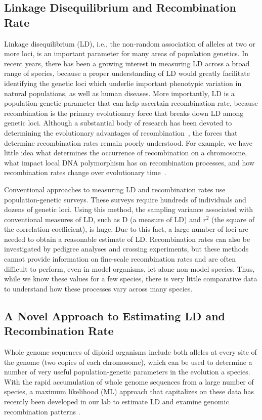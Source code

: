 \documentclass{sig-alternate}
\begin{document}
\subsection{Linkage Disequilibrium and Recombination Rate}\label{sec:LD}
Linkage disequilibrium (LD), i.e., the non-random association of alleles at two or more loci, is an important parameter for many areas of population genetics.  In recent years, there has been a growing interest in measuring LD across a broad range of species, because a proper understanding of LD would greatly facilitate identifying the genetic loci which underlie important phenotypic variation in natural populations, as well as human diseases. More importantly, LD is a population-genetic parameter that can help ascertain recombination rate, because recombination is the primary evolutionary force that breaks down LD among genetic loci. Although a substantial body of research has been devoted to determining the evolutionary advantages of recombination~\cite{resolving-paradox}, the forces that determine recombination rates remain poorly understood. For example, we have little idea what determines the occurrence of recombination on a chromosome, what impact local DNA polymorphism has on recombination processes, and how recombination rates change over evolutionary time~\cite{stumpf}. 

Conventional approaches to measuring LD and recombination rates use population-genetic surveys. These surveys require hundreds of individuals and dozens of genetic loci. Using this method, the sampling variance associated with conventional measures of LD, such as D (a measure of LD) and $r^2$ (the square of the correlation coefficient), is huge. Due to this fact, a large number of loci are needed to obtain a reasonable estimate of LD.  Recombination rates can also be investigated by pedigree analyses and crossing experiments, but these methods cannot provide information on fine-scale recombination rates and are often difficult to perform, even in model organisms, let alone non-model species. Thus, while we know these values for a few species, there is very little comparative data to understand how these processes vary across many species.

\subsection{ A Novel Approach to Estimating LD and Recombination Rate}\label{sec:migration}

Whole genome sequences of diploid organisms include both alleles at every site of the genome (two copies of each chromosome), which can be used to determine a number of very useful population-genetic parameters in the evolution a species. With the rapid accumulation of whole genome sequences from a large number of species, a maximum likelihood (ML) approach that capitalizes on these data has recently been developed in our lab to estimate LD and examine genomic recombination patterns \cite{Lynch01112008,MEC:MEC4482}.
\end{document}
